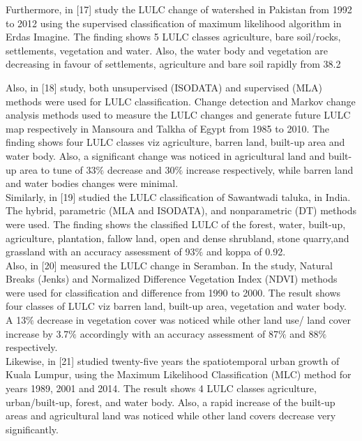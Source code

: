 \documentclass[12pt,a4paper]{article}
\begin{document}
	Furthermore, in [17] study the LULC change of watershed in Pakistan from 1992 to 2012 using the supervised classification of	maximum likelihood algorithm in Erdas Imagine. The finding	shows 5 LULC classes agriculture, bare soil/rocks, settlements,	vegetation and water. Also, the water body and vegetation are	decreasing in favour of settlements, agriculture and bare soil rapidly from 38.2%
	
	Also, in [18] study, both unsupervised (ISODATA) and supervised (MLA) methods were used for LULC classification. Change
	detection and Markov change analysis methods used to measure 	the LULC changes and generate future LULC map respectively in 	Mansoura and Talkha of Egypt from 1985 to 2010. The finding 	shows four LULC classes viz agriculture, barren land, built-up	area and water body. Also, a significant change was noticed in	agricultural land and built-up area to tune of 33$\%$ decrease and	30$\%$ increase respectively, while barren land and water bodies
	changes were minimal.\\
	
	Similarly, in [19] studied the LULC classification of Sawantwadi taluka, in India. The hybrid, parametric (MLA and ISODATA),	and nonparametric (DT) methods were used. The finding shows	the classified LULC of the forest, water, built-up, agriculture, 	plantation, fallow land, open and dense shrubland, stone quarry,and grassland with an accuracy assessment of 93$\%$ and koppa of	0.92.\\
	
	Also, in [20] measured the LULC change in Seramban. In the	study, Natural Breaks (Jenks) and Normalized Difference Vegetation Index (NDVI) methods were used for classification and difference from 1990 to 2000. The result shows four classes of	LULC viz barren land, built-up area, vegetation and water body. A	13$\%$ decrease in vegetation cover was noticed while other land	use/ land cover increase by 3.7$\%$ accordingly with an accuracy	assessment of 87$\%$ and 88$\%$ respectively.\\
	
	Likewise, in [21] studied twenty-five years the spatiotemporal	urban growth of Kuala Lumpur, using the Maximum Likelihood	Classification (MLC) method for years 1989, 2001 and 2014. The	result shows 4 LULC classes agriculture, urban/built-up, forest,	and water body. Also, a rapid increase of the built-up areas and	agricultural land was noticed while other land covers decrease very significantly.\\
	
\end{document}
